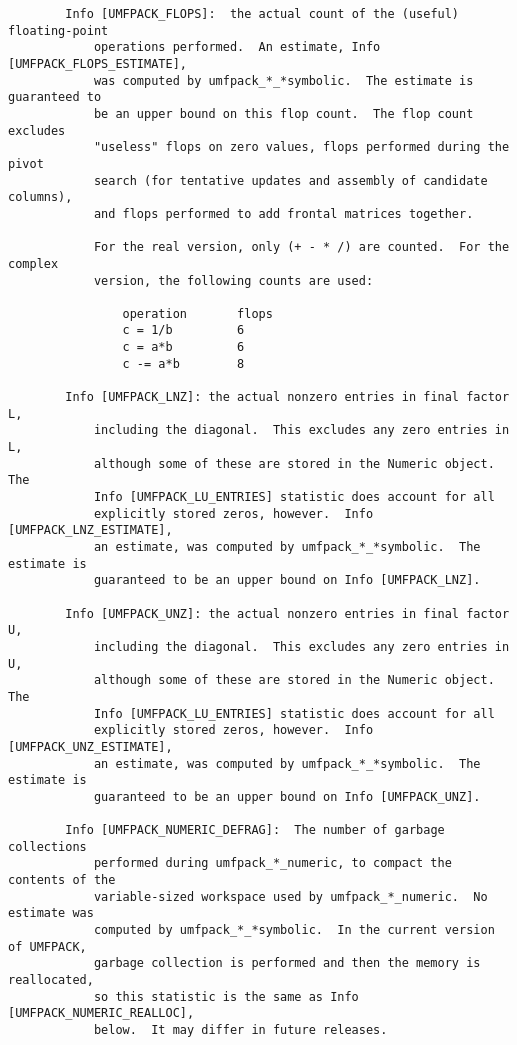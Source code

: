 \documentclass[11pt]{article}
\begin{document}
{\begin{verbatim}
        Info [UMFPACK_FLOPS]:  the actual count of the (useful) floating-point
            operations performed.  An estimate, Info [UMFPACK_FLOPS_ESTIMATE],
            was computed by umfpack_*_*symbolic.  The estimate is guaranteed to
            be an upper bound on this flop count.  The flop count excludes
            "useless" flops on zero values, flops performed during the pivot
            search (for tentative updates and assembly of candidate columns),
            and flops performed to add frontal matrices together.

            For the real version, only (+ - * /) are counted.  For the complex
            version, the following counts are used:

                operation       flops
                c = 1/b         6
                c = a*b         6
                c -= a*b        8

        Info [UMFPACK_LNZ]: the actual nonzero entries in final factor L,
            including the diagonal.  This excludes any zero entries in L,
            although some of these are stored in the Numeric object.  The
            Info [UMFPACK_LU_ENTRIES] statistic does account for all
            explicitly stored zeros, however.  Info [UMFPACK_LNZ_ESTIMATE],
            an estimate, was computed by umfpack_*_*symbolic.  The estimate is
            guaranteed to be an upper bound on Info [UMFPACK_LNZ].

        Info [UMFPACK_UNZ]: the actual nonzero entries in final factor U,
            including the diagonal.  This excludes any zero entries in U,
            although some of these are stored in the Numeric object.  The
            Info [UMFPACK_LU_ENTRIES] statistic does account for all
            explicitly stored zeros, however.  Info [UMFPACK_UNZ_ESTIMATE],
            an estimate, was computed by umfpack_*_*symbolic.  The estimate is
            guaranteed to be an upper bound on Info [UMFPACK_UNZ].

        Info [UMFPACK_NUMERIC_DEFRAG]:  The number of garbage collections
            performed during umfpack_*_numeric, to compact the contents of the
            variable-sized workspace used by umfpack_*_numeric.  No estimate was
            computed by umfpack_*_*symbolic.  In the current version of UMFPACK,
            garbage collection is performed and then the memory is reallocated,
            so this statistic is the same as Info [UMFPACK_NUMERIC_REALLOC],
            below.  It may differ in future releases.


\end{verbatim}}
\end{document}
